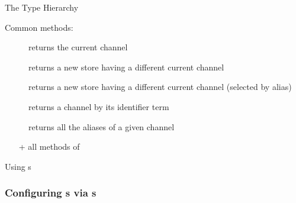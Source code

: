 \documentclass[handout]{beamer}
\begin{document}
\begin{frame}[allowframebreaks]{The  Type Hierarchy}
    \framebreak

    Common methods:
    \begin{description}
        \item[] returns the current channel
        \item[] returns a new store having a different current channel
        \item[] returns a new store having a different current channel (selected by \alert{alias})
        \item[] returns a channel by its identifier term
        \item[] returns all the aliases of a given channel
    \end{description}
    \begin{itemize}
        \item[+] all methods of 
    \end{itemize}
\end{frame}

\begin{frame}[allowframebreaks]{Using s}

\end{frame}

\subsubsection{Configuring s via s}
\end{document}

